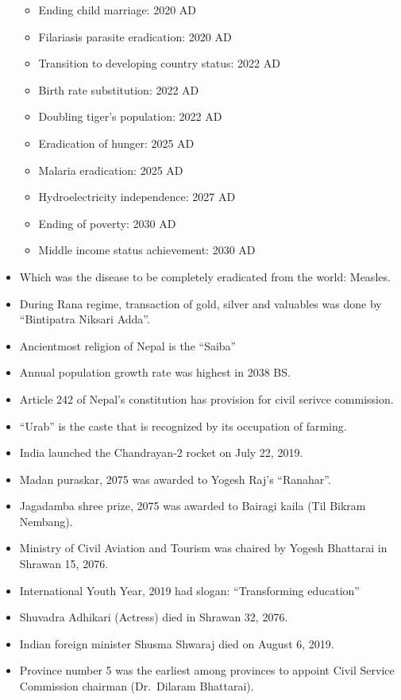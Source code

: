 \documentclass[
  openany]{book}
\providecommand{\tightlist}{%
  \setlength{\itemsep}{0pt}\setlength{\parskip}{0pt}}
\begin{document}
\begin{itemize}
  \begin{itemize}
  \tightlist
  \item
    Ending child marriage: 2020 AD
  \item
    Filariasis parasite eradication: 2020 AD
  \item
    Transition to developing country status: 2022 AD
  \item
    Birth rate substitution: 2022 AD
  \item
    Doubling tiger's population: 2022 AD
  \item
    Eradication of hunger: 2025 AD
  \item
    Malaria eradication: 2025 AD
  \item
    Hydroelectricity independence: 2027 AD
  \item
    Ending of poverty: 2030 AD
  \item
    Middle income status achievement: 2030 AD
  \end{itemize}
\item
  Which was the disease to be completely eradicated from the world: Measles.
\item
  During Rana regime, transaction of gold, silver and valuables was done by ``Bintipatra Niksari Adda''.
\item
  Ancientmost religion of Nepal is the ``Saiba''
\item
  Annual population growth rate was highest in 2038 BS.
\item
  Article 242 of Nepal's constitution has provision for civil serivce commission.
\item
  ``Urab'' is the caste that is recognized by its occupation of farming.
\item
  India launched the Chandrayan-2 rocket on July 22, 2019.
\item
  Madan puraskar, 2075 was awarded to Yogesh Raj's ``Ranahar''.
\item
  Jagadamba shree prize, 2075 was awarded to Bairagi kaila (Til Bikram Nembang).
\item
  Ministry of Civil Aviation and Tourism was chaired by Yogesh Bhattarai in Shrawan 15, 2076.
\item
  International Youth Year, 2019 had slogan: ``Transforming education''
\item
  Shuvadra Adhikari (Actress) died in Shrawan 32, 2076.
\item
  Indian foreign minister Shusma Shwaraj died on August 6, 2019.
\item
  Province number 5 was the earliest among provinces to appoint Civil Service Commission chairman (Dr.~Dilaram Bhattarai).

\end{itemize}
\end{document}
